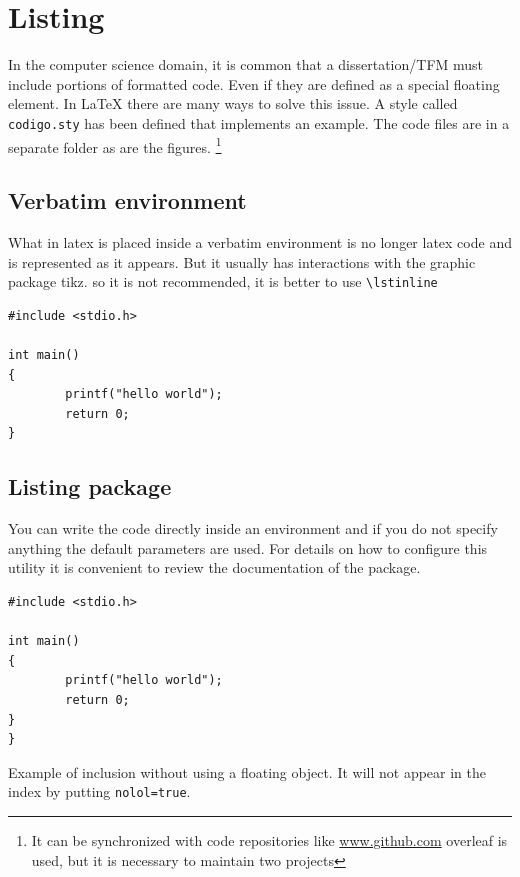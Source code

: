  \section{Listing}

In the computer science domain, it is common that a dissertation/TFM must include portions of formatted code. Even if they are defined as a special floating element. In \LaTeX{} there are many ways to solve this issue. A style called \lstinline[language=enparrafo]!codigo.sty! has been defined that implements an example. The code files are in a separate folder as are the figures. \footnote{It can be synchronized with code repositories like \url{www.github.com} overleaf is used, but it is necessary to maintain two projects}

\subsection{Verbatim environment}
What in latex is placed inside a verbatim environment is no longer latex code and is represented as it appears. But it usually has interactions with the graphic package tikz. so it is not recommended, it is better to use \lstinline[language=enparrafo]!\lstinline!

\begin{verbatim}
#include <stdio.h>

int main()
{
        printf("hello world");
        return 0;
}
\end{verbatim}

\subsection{Listing package}


You can write the code directly inside an environment and if you do not specify anything the default parameters are used. For details on how to configure this utility it is convenient to review the documentation of the package.

\begin{lstlisting}[caption=Ejemplo ]
#include <stdio.h>

int main()
{
        printf("hello world");
        return 0;
}
}
\end{lstlisting}

Example of inclusion without using a floating object. It will not appear in the index by putting \lstinline[language=enparrafo]!nolol=true!.




